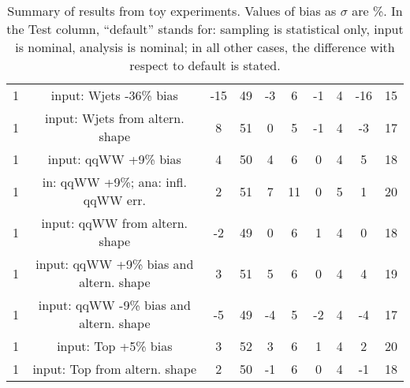 \begin{table}[!htb]
\begin{center}
\begin{tabular}{c | c  | c c | c c | c c | c c}
1 & input: Wjets -36\% bias             &-15 & 49 &-3 & 6  &-1 & 4 &-16 & 15 \\
1 & input: Wjets from altern. shape     & 8  & 51 & 0 & 5  &-1 & 4 &-3  & 17 \\
\hline
1 & input: qqWW +9\% bias               & 4  & 50 & 4 & 6  & 0 & 4 & 5  & 18 \\
1 & in: qqWW +9\%; ana: infl. qqWW err. & 2  & 51 & 7 & 11 & 0 & 5 & 1  & 20 \\
1 & input: qqWW from altern. shape      &-2  & 49 & 0 & 6  & 1 & 4 & 0  & 18 \\
1 & input: qqWW +9\% bias and altern. shape & 3  & 51 & 5 & 6 & 0 & 4 & 4  & 19 \\
1 & input: qqWW -9\% bias and altern. shape &-5  & 49 &-4 & 5 &-2 & 4 &-4  & 17 \\
\hline
1 & input: Top +5\% bias                & 3  & 52 & 3 & 6  & 1 & 4 & 2  & 20 \\
1 & input: Top from altern. shape       & 2  & 50 &-1 & 6  & 0 & 4 &-1  & 18 \\
\hline
\hline
\end{tabular}
\caption{Summary of results from toy experiments. Values of bias as $\sigma$ are \%.
In the Test column, ``default'' stands for: sampling is statistical only, input is nominal, analysis is nominal; 
in all other cases, the difference with respect to default is stated.}
\label{tab:toy_summary_hcp}
\end{center}
\end{table}




